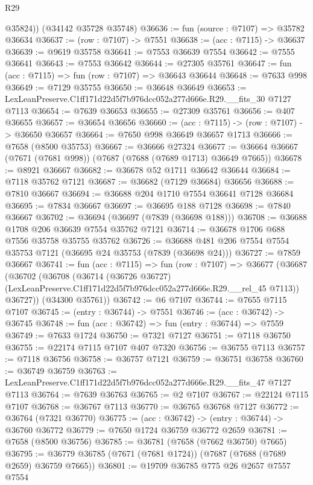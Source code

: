 \begin{lexlean}{R29}
\begin{coremodule}
        @35824))
    (@34142 @35728 @35748)
@36636 := fun (source : @7107) => @35782 @36634
@36637 := (row : @7107) -> @7551
@36638 := (acc : @7115) -> @36637
@36639 := @9619 @35758
@36641 := @7553 @36639 @7554
@36642 := @7555 @36641
@36643 := @7553 @36642
@36644 := @27305 @35761
@36647 := fun (acc : @7115) => fun (row : @7107) => @36643 @36644
@36648 := @7633 @998
@36649 := @7129 @35755
@36650 := @36648 @36649
@36653 := LexLeanPreserve.C1ff171d22d5f7b976dcc052a277d666e.R29.__fits_30 @7127 @7113
@36654 := @7639 @36653
@36655 := @27309 @35761
@36656 := @407 @36655
@36657 := @36654 @36656
@36660 := (acc : @7115) -> (row : @7107) -> @36650 @36657
@36664 := @7650 @998 @36649 @36657 @1713
@36666 := @7658 (@8500 @35753)
@36667 := @36666 @27324
@36677 := @36664 @36667 (@7671 (@7681 @998)) (@7687 (@7688 (@7689 @1713) @36649 @7665))
@36678 := @8921 @36667
@36682 := @36678 @52 @1711 @36642 @36644
@36684 := @7118 @35762 @7121
@36687 := @36682 (@7129 @36684) @36656
@36688 := @7810 @36667
@36694 := @36688 @204 @1710 @7554 @36641 @7128 @36684
@36695 := @7834 @36667
@36697 := @36695 @188 @7128
@36698 := @7840 @36667
@36702 := @36694 (@36697 (@7839 (@36698 @188)))
@36708 := @36688 @1708 @206 @36639 @7554 @35762 @7121
@36714 := @36678 @1706 @688 @7556 @35758 @35755 @35762
@36726 := @36688 @481 @206 @7554 @7554 @35753 @7121 (@36695 @24 @35753 (@7839 (@36698 @24)))
@36727 := @7859 @36667
@36741 := fun (acc : @7115) =>
  fun (row : @7107) =>
  @36677
    (@36687
      (@36702
        (@36708
          (@36714
            (@36726 @36727)
            (LexLeanPreserve.C1ff171d22d5f7b976dcc052a277d666e.R29.__rel_45 @7113))
          @36727))
      (@34300 @35761))
@36742 := @6 @7107
@36744 := @7655 @7115 @7107
@36745 := (entry : @36744) -> @7551
@36746 := (acc : @36742) -> @36745
@36748 := fun (acc : @36742) => fun (entry : @36744) => @7559
@36749 := @7633 @1724
@36750 := @7321 @7127
@36751 := @7118 @36750
@36755 := @22174 @7115 @7107 @407 @7320
@36756 := @36755 @7113
@36757 := @7118 @36756
@36758 := @36757 @7121
@36759 := @36751 @36758
@36760 := @36749 @36759
@36763 := LexLeanPreserve.C1ff171d22d5f7b976dcc052a277d666e.R29.__fits_47 @7127 @7113
@36764 := @7639 @36763
@36765 := @2 @7107
@36767 := @22124 @7115 @7107
@36768 := @36767 @7113
@36770 := @36765 @36768 @7127
@36772 := @36764 (@7321 @36770)
@36775 := (acc : @36742) -> (entry : @36744) -> @36760 @36772
@36779 := @7650 @1724 @36759 @36772 @2659
@36781 := @7658 (@8500 @36756)
@36785 := @36781 (@7658 (@7662 @36750) @7665)
@36795 := @36779 @36785 (@7671 (@7681 @1724)) (@7687 (@7688 (@7689 @2659) @36759 @7665))
@36801 := @19709 @36785 @775 @26 @2657 @7557 @7554

\end{coremodule}
\end{lexlean}
